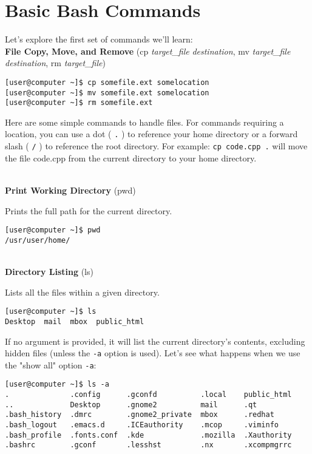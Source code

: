 \documentclass[11pt,oneside]{article}
\newenvironment{articleSectionN}[1]
{#1}
{}
\begin{document}
\section{Basic Bash Commands}
\begin{articleSectionN}
\noindent Let's explore the first set of commands we'll learn:\\

\noindent\textbf{File Copy, Move, and Remove} (cp \emph{target\_file} \emph{destination}, mv \emph{target\_file} \emph{destination}, rm \emph{target\_file})
\begin{lstlisting}
[user@computer ~]$ cp somefile.ext somelocation
[user@computer ~]$ mv somefile.ext somelocation
[user@computer ~]$ rm somefile.ext
\end{lstlisting}

Here are some simple commands to handle files. For commands requiring a location, you can use a dot ( \lstinline{.} ) to reference your home directory or a forward slash ( \lstinline{/} ) to reference the root directory. For example: \lstinline{cp code.cpp .} will move the file code.cpp from the current directory to your home directory.

\quad \\
\noindent\textbf{Print Working Directory} (pwd)

Prints the full path for the current directory.

\begin{lstlisting}
[user@computer ~]$ pwd
/usr/user/home/
\end{lstlisting}

\quad \\
\noindent\textbf{Directory Listing} (ls)

Lists all the files within a given directory.

\begin{lstlisting}
[user@computer ~]$ ls
Desktop  mail  mbox  public_html
\end{lstlisting}
    
If no argument is provided, it will list the current directory's contents, excluding hidden files (unless the \lstinline{-a} option is used). Let's see what happens when we use the "show all" option \lstinline{-a}:
    
\begin{lstlisting}
[user@computer ~]$ ls -a
.              .config      .gconfd          .local    public_html  
..             Desktop      .gnome2          mail      .qt
.bash_history  .dmrc        .gnome2_private  mbox      .redhat
.bash_logout   .emacs.d     .ICEauthority    .mcop     .viminfo
.bash_profile  .fonts.conf  .kde             .mozilla  .Xauthority
.bashrc        .gconf       .lesshst         .nx       .xcompmgrrc
\end{lstlisting}
    

\end{articleSectionN}
\end{document}

